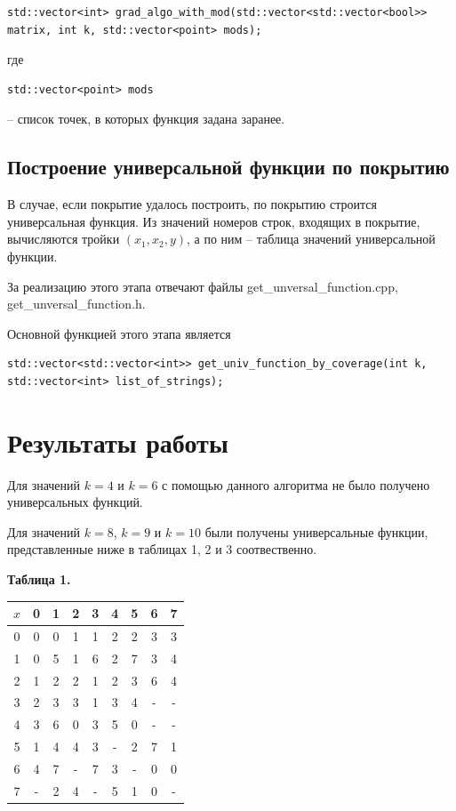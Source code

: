 \documentclass[oneside,final,14pt]{extreport}
\begin{document}
\begin{lstlisting}
std::vector<int> grad_algo_with_mod(std::vector<std::vector<bool>> matrix, int k, std::vector<point> mods);
\end{lstlisting}

где 
\begin{lstlisting} 
std::vector<point> mods 
\end{lstlisting} 
-- список точек, в которых функция задана заранее.

\section*{Построение универсальной функции по покрытию}

В случае, если покрытие удалось построить, по покрытию строится универсальная функция. Из значений номеров строк, входящих в 
покрытие, вычисляются тройки \((x_1, x_2, y)\), а по ним -- таблица значений универсальной функции.

За реализацию этого этапа отвечают файлы \dq get\_unversal\_function.cpp\dq, \dq get\_unversal\_function.h\dq.

Основной функцией этого этапа является

\begin{lstlisting}
std::vector<std::vector<int>> get_univ_function_by_coverage(int k, std::vector<int> list_of_strings);
\end{lstlisting}


\chapter*{Результаты работы}

Для значений \(k = 4\) и \(k = 6\) с помощью данного алгоритма не было получено универсальных функций.

Для значений \(k = 8\), \(k = 9\) и \(k = 10\) были получены универсальные функции, представленные ниже 
в таблицах 1, 2 и 3 соотвественно.

\centerline{\bf Таблица 1.}
\begin{center}
\begin{tabular}{|c|c|c|c|c|c|c|c|c|}
\hline \(x\) & 0 & 1 & 2 & 3 & 4 & 5 & 6 & 7 \\ \hline
0 & 0 & 0 & 1 & 1 & 2 & 2 & 3 & 3 \\ \hline 
1 & 0 & 5 & 1 & 6 & 2 & 7 & 3 & 4 \\ \hline
2 & 1 & 2 & 2 & 1 & 2 & 3 & 6 & 4 \\ \hline
3 & 2 & 3 & 3 & 1 & 3 & 4 & - & - \\ \hline
4 & 3 & 6 & 0 & 3 & 5 & 0 & - & - \\ \hline
5 & 1 & 4 & 4 & 3 & - & 2 & 7 & 1 \\ \hline
6 & 4 & 7 & - & 7 & 3 & - & 0 & 0 \\ \hline
7 & - & 2 & 4 & - & 5 & 1 & 0 & - \\ \hline
\end{tabular}
\end{center}
\end{document}
